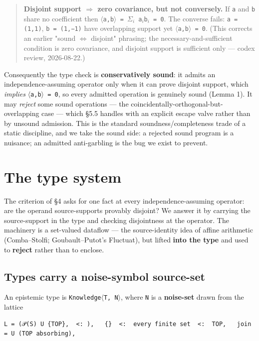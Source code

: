 \documentclass[sigplan,review,anonymous,10pt]{acmart}
\begin{document}
\begin{quote}
\textbf{Disjoint support $\Rightarrow$ zero covariance, but not conversely.} If \texttt{a} and \texttt{b} share no coefficient then \texttt{$\langle$a,b$\rangle$ = $\Sigma_{i}$ a$_{i}$b$_{i}$ = 0}. The converse fails: \texttt{a = (1,1)}, \texttt{b = (1,−1)} have overlapping support yet \texttt{$\langle$a,b$\rangle$ = 0}. (This corrects an earlier "sound $\Leftrightarrow$ disjoint" phrasing; the necessary-and-sufficient condition is zero covariance, and disjoint support is sufficient only --- codex review, 2026-08-22.)
\end{quote}

Consequently the type check is \textbf{conservatively sound}: it admits an independence-assuming operator only when it can prove disjoint support, which \emph{implies} \texttt{$\langle$a,b$\rangle$ = 0}, so every admitted operation is genuinely sound (Lemma 1). It may \emph{reject} some sound operations --- the coincidentally-orthogonal-but-overlapping case --- which §5.5 handles with an explicit escape valve rather than by unsound admission. This is the standard soundness/completeness trade of a static discipline, and we take the sound side: a rejected sound program is a nuisance; an admitted anti-garbling is the bug we exist to prevent.

\section{The type system}

The criterion of §4 asks for one fact at every independence-assuming operator: are the operand source-supports provably disjoint? We answer it by carrying the source-support in the type and checking disjointness at the operator. The machinery is a set-valued dataflow --- the source-identity idea of affine arithmetic (Comba--Stolfi; Goubault--Putot's Fluctuat), but lifted \textbf{into the type} and used to \textbf{reject} rather than to enclose.

\subsection{Types carry a noise-symbol source-set}

An epistemic type is \texttt{Knowledge$\langle$T, N$\rangle$}, where \texttt{N} is a \textbf{noise-set} drawn from the lattice

\begin{lstlisting}
L = (𝒫(S) U {TOP},  <: ),   {}  <:  every finite set  <:  TOP,   join = U (TOP absorbing),
\end{lstlisting}
\end{document}
